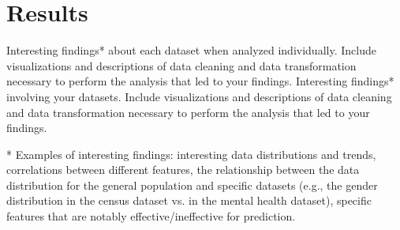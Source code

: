 \section{Results}

    

Interesting findings* about each dataset when analyzed individually. Include visualizations and descriptions of data cleaning and data transformation necessary to perform the analysis that led to your findings.
Interesting findings* involving your datasets. Include visualizations and descriptions of data cleaning and data transformation necessary to perform the analysis that led to your findings.

* Examples of interesting findings: interesting data distributions and trends, correlations between different features, the relationship between the data distribution for the general population and specific datasets (e.g., the gender distribution in the census dataset vs. in the mental health dataset), specific features that are notably effective/ineffective for prediction.

